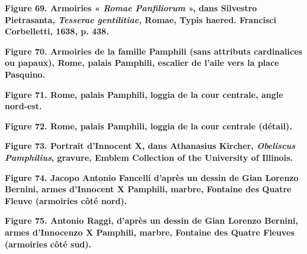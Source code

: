 \documentclass[12pt,twoside,openany]{book}
\begin{document}
\begin{center}
\par\small \textbf{Figure 69. Armoiries « \textit{Romae Panfiliorum} », dans Silvestro Pietrasanta, \textit{Tesserae gentilitiae,} Romae, Typis haered. Francisci Corbelletti, 1638, p. 438.}
\end{center}

\begin{center}
\par\small \textbf{Figure 70. Armoiries de la famille Pamphili (sans attributs cardinalices ou papaux), Rome, palais Pamphili, escalier de l’aile vers la place Pasquino.}
\end{center}

\begin{center}
\par\small \textbf{Figure 71. Rome, palais Pamphili, loggia de la cour centrale, angle nord-est.}
\end{center}

\begin{center}
\par\small \textbf{Figure 72. Rome, palais Pamphili, loggia de la cour centrale (détail).}
\end{center}

\begin{center}
\par\small \textbf{Figure 73. Portrait d’Innocent X, dans Athanasius Kircher, \textit{Obeliscus Pamphilius}, gravure, Emblem Collection of the University of Illinois.}
\end{center}

\begin{center}
\par\small \textbf{Figure 74. Jacopo Antonio Fancelli d’après un dessin de Gian Lorenzo Bernini, armes d’Innocent X Pamphili, marbre, Fontaine des Quatre Fleuve (armoiries côté nord).}
\end{center}

\begin{center}
\par\small \textbf{Figure 75. Antonio Raggi, d’après un dessin de Gian Lorenzo Bernini, armes d’Innocenzo X Pamphili, marbre, Fontaine des Quatre Fleuves (armoiries côté sud).}
\end{center}
\end{document}
